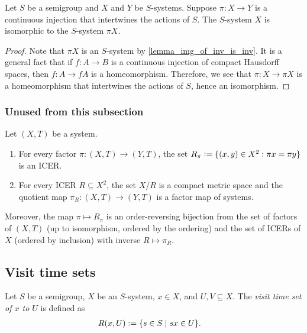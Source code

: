 \begin{theorem}
    \label{thm_system_is_isomorphic_to_injective_factor_image}
    Let $S$ be a semigroup and $X$ and $Y$ be $S$-systems.  Suppose $\pi: X \to Y$ is a continuous injection that intertwines the actions of $S$.  The $S$-system $X$ is isomorphic to the $S$-system $\pi X$.
\end{theorem}

\begin{proof}
    Note that $\pi X$ is an $S$-system by \cref{lemma_img_of_inv_is_inv}.  It is a general fact that if $f: A \to B$ is a continuous injection of compact Hausdorff spaces, then $f: A \to fA$ is a homeomorphism.  Therefore, we see that $\pi: X \to \pi X$ is a homeomorphism that intertwines the actions of $S$, hence an isomorphism.
\end{proof}

\subsubsection{Unused from this subsection}

\begin{lemma}
\label{lemma_factors_and_icers}
    Let $(X,T)$ be a system.
    \begin{enumerate}
        \item For every factor $\pi: (X,T) \to (Y,T)$, the set $R_\pi \vcentcolon= \{(x,y) \in X^2 : \pi x = \pi y\}$ is an ICER.
        \item For every ICER $R \subseteq X^2$, the set $X / R$ is a compact metric space and the quotient map $\pi_R: (X,T) \to (Y,T)$ is a factor map of systems.
    \end{enumerate}
    Moreover, the map $\pi \mapsto R_\pi$ is an order-reversing bijection from the set of factors of $(X,T)$ (up to isomorphism, ordered by the ordering) and the set of ICERs of $X$ (ordered by inclusion) with inverse $R \mapsto \pi_R$.
\end{lemma}


\subsection{Visit time sets}

\begin{definition}
\label{def_point_visit_time_set}
\leanok{}
    Let $S$ be a semigroup, $X$ be an $S$-system, $x \in X$, and $U, V \subseteq X$.  The \emph{visit time set of $x$ to $U$} is defined as
    \begin{align*}
        R(x,U) &\vcentcolon= \{s \in S \mid sx \in U \}.
    \end{align*}
\end{definition}


